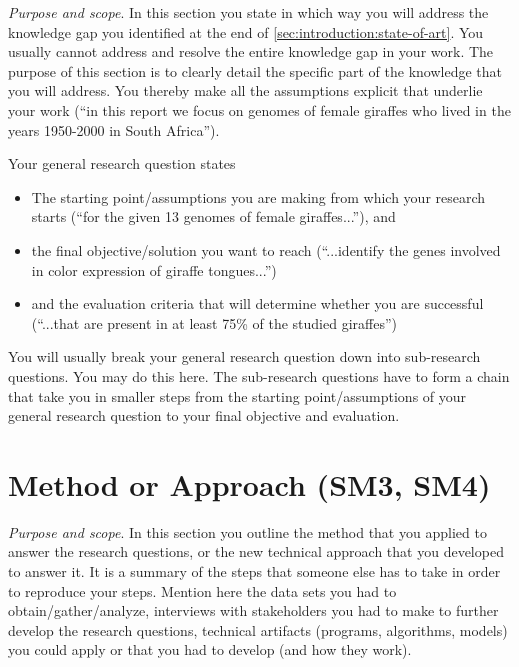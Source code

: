\documentclass[
  numbers=autoendperiod,
  ngerman,  %
  a4paper,  %
  twoside,  %
  bibliography=totoc,
  headsepline,
  cleardoublepage=empty,
  parskip=half,
  draft=false
]{scrbook}
\theoremstyle{break}
\begin{document}
\emph{Purpose and scope}.
In this section you state in which way you will address the knowledge gap you identified at the end of \cref{sec:introduction:state-of-art}.
You usually cannot address and resolve the entire knowledge gap in your work.
The purpose of this section is to clearly detail the specific part of the knowledge that you will address.
You thereby make all the assumptions explicit that underlie your work (``in this report we focus on genomes of female giraffes who lived in the years 1950-2000 in South Africa'').

Your general research question states
\begin{itemize}
  \item The starting point/assumptions you are making from which your research starts (``for the given 13 genomes of female giraffes...''), and
  \item the final objective/solution you want to reach (``...identify the genes involved in color expression of giraffe tongues...'')
  \item and the evaluation criteria that will determine whether you are successful (``...that are present in at least 75\% of the studied giraffes'')
\end{itemize}

You will usually break your general research question down into sub-research questions.
You may do this here.
The sub-research questions have to form a chain that take you in smaller steps from the starting point/assumptions of your general research question to your final objective and evaluation.

\section{Method or Approach (SM3, SM4)}\label{sec:introduction:method}

\emph{Purpose and scope}.
In this section you outline the method that you applied to answer the research questions, or the new technical approach that you developed to answer it.
It is a summary of the steps that someone else has to take in order to reproduce your steps.
Mention here the data sets you had to obtain/gather/analyze, interviews with stakeholders you had to make to further develop the research questions, technical artifacts (programs, algorithms, models) you could apply or that you had to develop (and how they work).
\end{document}
